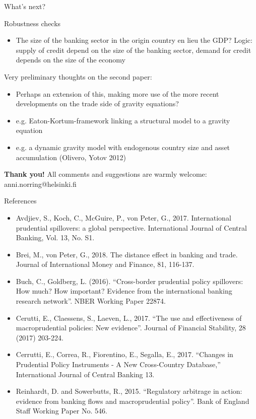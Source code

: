 \documentclass{beamer}
\begin{document}
\begin{frame}{What's next?}
\begin{block}{Robustness checks}
\begin{itemize}
\item The size of the banking sector in the origin country en lieu the GDP? Logic: supply of credit depend on the size of the banking sector, demand for credit depends on the size of the economy
\end{itemize}
\end{block}
\begin{block}{Very preliminary thoughts on the second paper:}
\begin{itemize}
\item Perhaps an extension of this, making more use of the more recent developments on the trade side of gravity equations?
\item e.g. Eaton-Kortum-framework linking a structural model to a gravity equation 
\item e.g. a dynamic gravity model with endogenous country size and asset accumulation (Olivero, Yotov 2012)
\end{itemize}
\end{block}
\end{frame}

\begin{frame}
\begin{center}
\textbf{Thank you!}
\vskip 1cm
All comments and suggestions are warmly welcome: \\
anni.norring@helsinki.fi
\end{center}
\end{frame}

\begin{frame}{References}
\begin{itemize}
\item Avdjiev, S., Koch, C., McGuire, P., von Peter, G., 2017. International prudential spillovers: a global perspective. International Journal of Central Banking, Vol. 13, No. S1.
\item Brei, M., von Peter, G., 2018. The distance effect in banking and trade. Journal of International Money and Finance, 81, 116-137.
\item Buch, C., Goldberg, L. (2016). “Cross-border prudential policy spillovers: How much? How important? Evidence from the international banking research network”. NBER Working Paper 22874.
\item Cerutti, E., Claessens, S., Laeven, L., 2017. “The use and effectiveness of macroprudential policies: New evidence”. Journal of Financial Stability, 28 (2017) 203-224.
\item Cerrutti, E., Correa, R., Fiorentino, E., Segalla, E., 2017. “Changes in Prudential Policy Instruments - A New Cross-Country Database,” International Journal of Central Banking 13.
\item Reinhardt, D. and Sowerbutts, R., 2015. “Regulatory arbitrage in action: evidence from banking flows and macroprudential policy”. Bank of England Staff Working Paper No. 546.
\end{itemize}
\end{frame}
\end{document}
